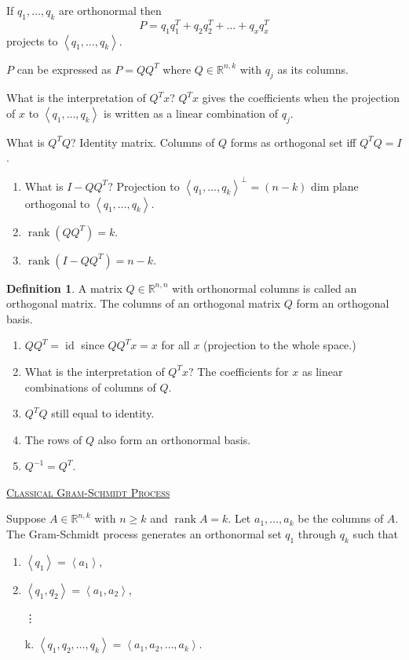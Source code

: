 \documentclass{report}
\newcommand{\R}{\mathbb{R}}
\def \id {\operatorname{id}}
\def \rank {\operatorname{rank}}
\newcommand{\gen}[1]{\left\langle #1\right\rangle}
\newcommand{\fancyem}[1]{\underline{\textsc{#1}}}
\theoremstyle{definition}
\newtheorem{definition}{Definition}[section]
\theoremstyle{remark}
\numberwithin{equation}{section}
\begin{document}
If $q_1, \ldots, q_k$ are orthonormal then \[
    P = q_1q_1^T + q_2q_2^T + \ldots + q_xq_x^T    
\] projects to $\gen{q_1, \ldots, q_k}$.

$P$ can be expressed as $P = QQ^T$ where $Q \in \R^{n, k}$ with $q_j$ as its columns.

What is the interpretation of $Q^Tx$?
$Q^Tx$ gives the coefficients when the projection of $x$ to $\gen{q_1, \ldots, q_k}$ is written as a linear combination of $q_j$.

What is $Q^TQ$? Identity matrix.
Columns of $Q$ forms as orthogonal set iff $Q^TQ = I$.

\begin{enumerate}
    \item What is $I - QQ^T$? Projection to $\gen{q_1, \ldots, q_k}^\perp = (n - k)$ dim plane orthogonal to $\gen{q_1, \ldots, q_k}$.
    \item $\rank(QQ^T) = k$.
    \item $\rank(I - QQ^T) = n - k$.
\end{enumerate}
\begin{definition}
    A matrix $Q \in \R^{n, n}$ with orthonormal columns is called an orthogonal matrix. The columns of an orthogonal matrix $Q$ form an orthogonal basis.
\end{definition}
\begin{enumerate}
    \item $QQ^T = \id$ since $QQ^Tx = x$ for all $x$ (projection to the whole space.)
    \item What is the interpretation of $Q^Tx$? The coefficients for $x$ as linear combinations of columns of $Q$.
    \item $Q^TQ$ still equal to identity.
    \item The rows of $Q$ also form an orthonormal basis.
    \item $Q^{-1} = Q^T$.
\end{enumerate}

\fancyem{Classical Gram-Schmidt Process}

Suppose $A \in \R^{n, k}$ with $n \geq k$ and $\rank A = k$. Let $a_1, \ldots, a_k$ be the columns of $A$. The Gram-Schmidt process generates an orthonormal set $q_1$ through $q_k$ such that \begin{enumerate}
    \item $\gen{q_1} = \gen{a_1}$,
    \item $\gen{q_1, q_2} = \gen{a_1, a_2}$,
    \item[\vdots]
    \item[k.] $\gen{q_1, q_2, \ldots, q_k} = \gen{a_1, a_2, \ldots, a_k}$.
\end{enumerate}
\end{document}
